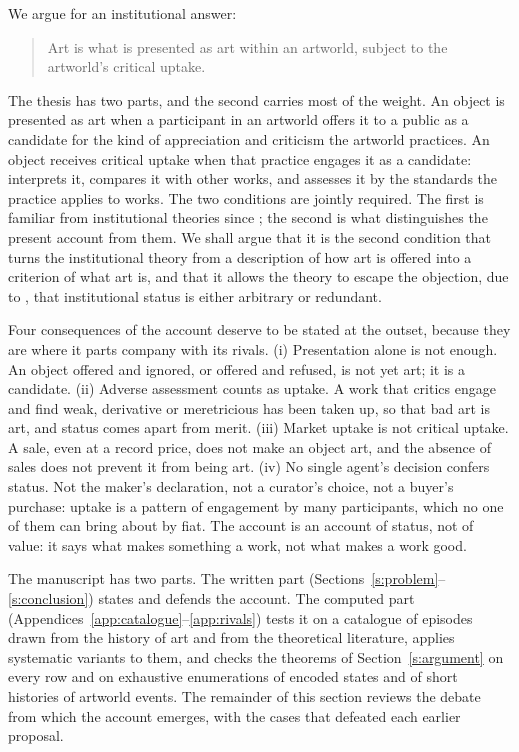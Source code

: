 \documentclass{situationist-preprint}
\begin{document}
We argue for an institutional answer:

\begin{quote}
Art is what is presented as art within an artworld, subject to the artworld's critical uptake.
\end{quote}

The thesis has two parts, and the second carries most of the weight. An object is presented as art when a participant in an artworld offers it to a public as a candidate for the kind of appreciation and criticism the artworld practices. An object receives critical uptake when that practice engages it as a candidate: interprets it, compares it with other works, and assesses it by the standards the practice applies to works. The two conditions are jointly required. The first is familiar from institutional theories since \citet{Dickie1974}; the second is what distinguishes the present account from them. We shall argue that it is the second condition that turns the institutional theory from a description of how art is offered into a criterion of what art is, and that it allows the theory to escape the objection, due to \citet{Wollheim1980}, that institutional status is either arbitrary or redundant.

Four consequences of the account deserve to be stated at the outset, because they are where it parts company with its rivals. (i) Presentation alone is not enough. An object offered and ignored, or offered and refused, is not yet art; it is a candidate. (ii) Adverse assessment counts as uptake. A work that critics engage and find weak, derivative or meretricious has been taken up, so that bad art is art, and status comes apart from merit. (iii) Market uptake is not critical uptake. A sale, even at a record price, does not make an object art, and the absence of sales does not prevent it from being art. (iv) No single agent's decision confers status. Not the maker's declaration, not a curator's choice, not a buyer's purchase: uptake is a pattern of engagement by many participants, which no one of them can bring about by fiat. The account is an account of status, not of value: it says what makes something a work, not what makes a work good.

The manuscript has two parts. The written part (Sections~\ref{s:problem}--\ref{s:conclusion}) states and defends the account. The computed part (Appendices~\ref{app:catalogue}--\ref{app:rivals}) tests it on a catalogue of \stnepisodes{} episodes drawn from the history of art and from the theoretical literature, applies \stnvariants{} systematic variants to them, and checks the theorems of Section~\ref{s:argument} on every row and on exhaustive enumerations of encoded states and of short histories of artworld events. The remainder of this section reviews the debate from which the account emerges, with the cases that defeated each earlier proposal.
\end{document}

